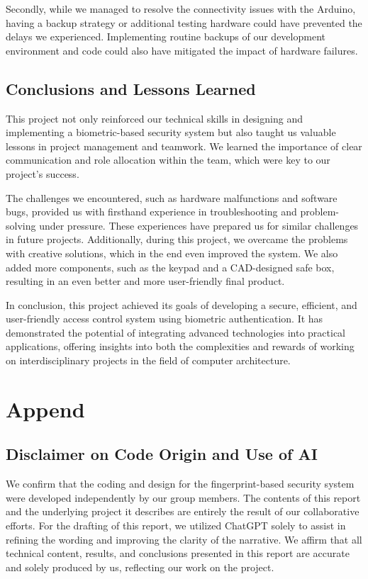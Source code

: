 \documentclass{article}
\begin{document}
Secondly, while we managed to resolve the connectivity issues with the Arduino, having a backup strategy or additional testing hardware could have prevented the delays we experienced. Implementing routine backups of our development environment and code could also have mitigated the impact of hardware failures.

\subsection{Conclusions and Lessons Learned}
This project not only reinforced our technical skills in designing and implementing a biometric-based security system but also taught us valuable lessons in project management and teamwork. We learned the importance of clear communication and role allocation within the team, which were key to our project's success.

The challenges we encountered, such as hardware malfunctions and software bugs, provided us with firsthand experience in troubleshooting and problem-solving under pressure. These experiences have prepared us for similar challenges in future projects. Additionally, during this project, we overcame the problems with creative solutions, which in the end even improved the system. We also added more components, such as the keypad and a CAD-designed safe box, resulting in an even better and more user-friendly final product.

In conclusion, this project achieved its goals of developing a secure, efficient, and user-friendly access control system using biometric authentication. It has demonstrated the potential of integrating advanced technologies into practical applications, offering insights into both the complexities and rewards of working on interdisciplinary projects in the field of computer architecture.

\section{Append}

\subsection{Disclaimer on Code Origin and Use of AI}
We confirm that the coding and design for the fingerprint-based security system were developed independently by our group members. The contents of this report and the underlying project it describes are entirely the result of our collaborative efforts. For the drafting of this report, we utilized ChatGPT solely to assist in refining the wording and improving the clarity of the narrative. We affirm that all technical content, results, and conclusions presented in this report are accurate and solely produced by us, reflecting our work on the project.
\end{document}
